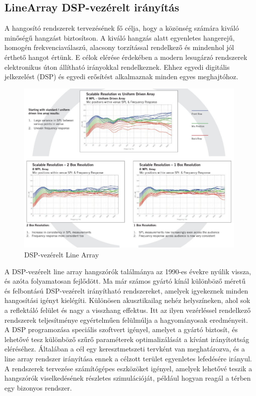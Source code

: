 \subsection{LineArray DSP-vezérelt irányítás~\cite{AHNERT2023}}
A hangosító rendszerek tervezésének fő célja, hogy a közönség számára kiváló minőségű hangzást biztosítson. 
A kiváló hangzás alatt egyenletes hangerejű, homogén frekvenciaválaszú, alacsony torzítással rendelkező és mindenhol jól érthető hangot értünk. 
E célok elérése érdekében a modern lesugárzó rendszerek elektronikus úton állítható irányokkal rendelkeznek. 
Ehhez egyedi digitális jelkezelést (DSP) és egyedi erősítést alkalmaznak minden egyes meghajtóhoz.
\begin{figure}[H]
    \centering
    \includegraphics[width=\linewidth, keepaspectratio]{figures/dsp_arrays.jpg}
    \caption{DSP-vezérelt Line Array~\cite{AHNERT2023}}
    \label{fig:dsp_arrays}
\end{figure}
A DSP-vezérelt line array hangszórók találmánya az 1990-es évekre nyúlik vissza, és azóta folyamatosan fejlődött.
Ma már számos gyártó kínál különböző méretű és felbontású DSP-vezérelt irányítható rendszereket, 
amelyek igyekeznek minden hangosítási igényt kielégíti. 
Különösen akusztikailag nehéz helyszíneken, ahol sok a reflektáló felület és nagy a visszhang effektus. 
Itt az ilyen vezérléssel rendelkező rendszerek teljesítménye egyértelműen felülmúlja a hagyományosak eredményeit. 
A DSP programozása speciális szoftvert igényel, amelyet a gyártó biztosít, és lehetővé tesz különböző szűrő paraméterek optimalizálását a kívánt irányítottság eléréséhez. 
Általában a cél egy keresztmetszeti tervként van meghatározva, és a line array rendszer irányítása ennek a célzott terület egyenletes lefedésére irányul.
A rendszerek tervezése számítógépes eszközöket igényel, amelyek lehetővé teszik a hangszórók viselkedésének részletes szimulációját, például hogyan reagál a térben egy bizonyos rendszer.

